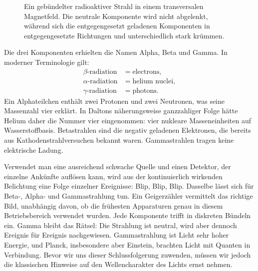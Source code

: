 \begin{figure}[h]\centering
{}\caption{Ein gebündelter radioaktiver Strahl in einem transversalen Magnetfeld. Die neutrale Komponente wird nicht abgelenkt, während sich die entgegengesetzt geladenen Komponenten in entgegengesetzte Richtungen und unterschiedlich stark krümmen.}\end{figure}

Die drei Komponenten erhielten die Namen Alpha, Beta und Gamma. In moderner Terminologie gilt:
\begin{equation}
\begin{aligned}
\beta\text{-radiation} &= \text{electrons},\\
\alpha\text{-radiation} &= \text{helium nuclei},\\
\gamma\text{-radiation} &= \text{photons}.
\end{aligned}
\end{equation}
Ein Alphateilchen enthält zwei Protonen und zwei Neutronen, was seine Massenzahl vier erklärt. In Daltons näherungsweise ganzzahliger Folge hätte Helium daher die Nummer vier eingenommen: vier nukleare Masseneinheiten auf Wasserstoffbasis. Betastrahlen sind die negativ geladenen Elektronen, die bereits aus Kathodenstrahlversuchen bekannt waren. Gammastrahlen tragen keine elektrische Ladung.

Verwendet man eine ausreichend schwache Quelle und einen Detektor, der einzelne Ankünfte auflösen kann, wird aus der kontinuierlich wirkenden Belichtung eine Folge einzelner Ereignisse: Blip, Blip, Blip. Dasselbe lässt sich für Beta-, Alpha- und Gammastrahlung tun. Ein Geigerzähler vermittelt das richtige Bild, unabhängig davon, ob die frühesten Apparaturen genau in diesem Betriebsbereich verwendet wurden. Jede Komponente trifft in diskreten Bündeln ein. Gamma bleibt das Rätsel: Die Strahlung ist neutral, wird aber dennoch Ereignis für Ereignis nachgewiesen. Gammastrahlung ist Licht sehr hoher Energie, und Planck, insbesondere aber Einstein, brachten Licht mit Quanten in Verbindung. Bevor wir uns dieser Schlussfolgerung zuwenden, müssen wir jedoch die klassischen Hinweise auf den Wellencharakter des Lichts ernst nehmen.

